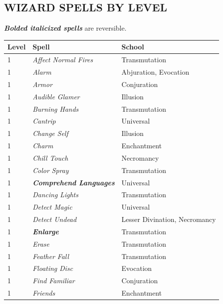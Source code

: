 \begin{multicols}{2}
\section{WIZARD SPELLS BY LEVEL}

\textbf{\textit{Bolded italicized spells}} are reversible.

\noindent
\begin{minipage}{\columnwidth}

\label{wizardspelllist}
\noindent
\begin{tabular}{|p{}|p{}|p{}|}
\hline
Level	& Spell	& School \\
\hline\hline
\rowcolor[gray]{.9}1	& \textit{Affect Normal Fires}	& Transmutation \\
1	& \textit{Alarm}	& Abjuration, Evocation \\
\rowcolor[gray]{.9}1	& \textit{Armor}	& Conjuration \\
1	& \textit{Audible Glamer}	& Illusion \\
\rowcolor[gray]{.9}1	& \textit{Burning Hands}	& Transmutation \\
1	& \textit{Cantrip}	& Universal \\
\rowcolor[gray]{.9}1	& \textit{Change Self}	& Illusion \\
1	& \textit{Charm}	& Enchantment \\
\rowcolor[gray]{.9}1	& \textit{Chill Touch}	& Necromancy \\
1	& \textit{Color Spray}	& Transmutation \\
\rowcolor[gray]{.9}1	& \textbf{\textit{Comprehend Languages}}	& Universal \\
1	& \textit{Dancing Lights}	& Transmutation \\
\rowcolor[gray]{.9}1	& \textit{Detect Magic}	& Universal \\
1	& \textit{Detect Undead}	& Lesser Divination, Necromancy \\
\rowcolor[gray]{.9}1	& \textbf{\textit{Enlarge}}	& Transmutation \\
1	& \textit{Erase}	& Transmutation \\
\rowcolor[gray]{.9}1	& \textit{Feather Fall}	& Transmutation \\
1	& \textit{Floating Disc}	& Evocation \\
\rowcolor[gray]{.9}1	& \textit{Find Familiar}	& Conjuration \\
1	& \textit{Friends}	& Enchantment \\

\end{tabular}
\end{minipage}
\end{multicols}
